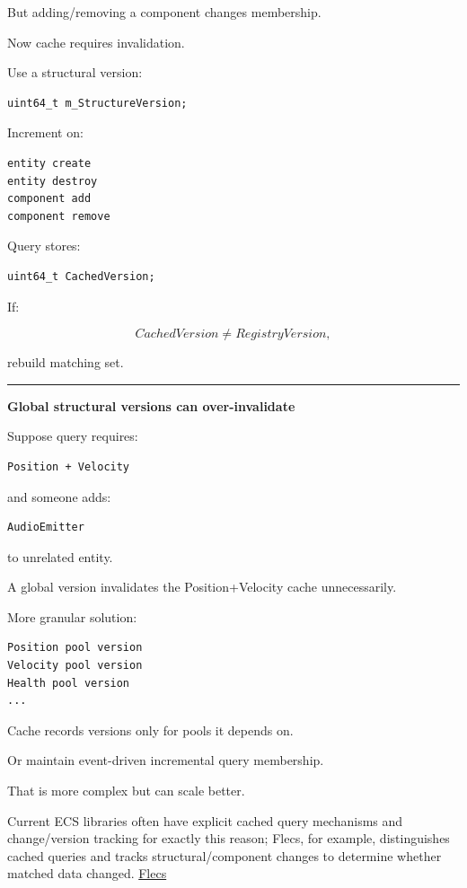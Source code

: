 But adding/removing a component changes membership.

Now cache requires invalidation.

Use a structural version:

\begin{verbatim}
uint64_t m_StructureVersion;
\end{verbatim}

Increment on:

\begin{verbatim}
entity create
entity destroy
component add
component remove
\end{verbatim}

Query stores:

\begin{verbatim}
uint64_t CachedVersion;
\end{verbatim}

If:

\[
CachedVersion\neq RegistryVersion,
\]

rebuild matching set.

\begin{center}\rule{0.5\linewidth}{0.5pt}\end{center}

\textbf{Global structural versions can over-invalidate}

Suppose query requires:

\begin{verbatim}
Position + Velocity
\end{verbatim}

and someone adds:

\begin{verbatim}
AudioEmitter
\end{verbatim}

to unrelated entity.

A global version invalidates the Position+Velocity cache unnecessarily.

More granular solution:

\begin{verbatim}
Position pool version
Velocity pool version
Health pool version
...
\end{verbatim}

Cache records versions only for pools it depends on.

Or maintain event-driven incremental query membership.

That is more complex but can scale better.

Current ECS libraries often have explicit cached query mechanisms and change/version tracking for exactly this reason; Flecs, for example, distinguishes cached queries and tracks structural/component changes to determine whether matched data changed. \href{https://www.flecs.dev/flecs/Queries.html?utm_source=chatgpt.com}{Flecs}

